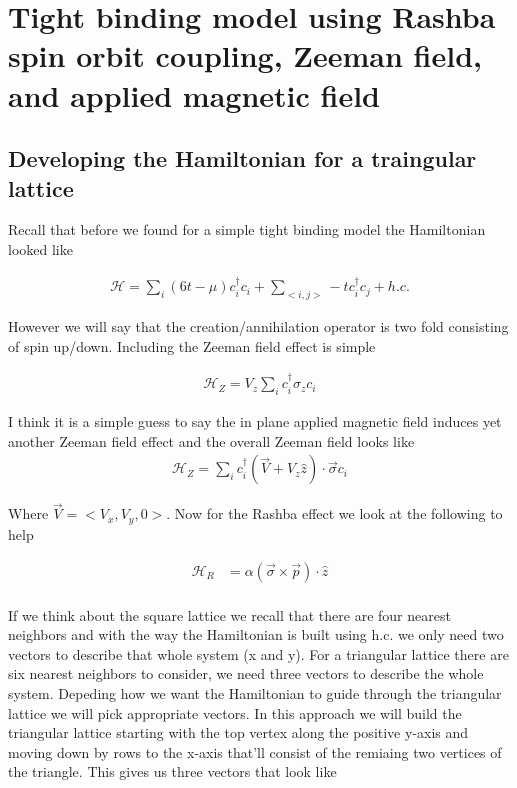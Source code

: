 \chapter{Tight binding model using Rashba spin orbit coupling, Zeeman field, and applied magnetic field}
\section{Developing the Hamiltonian for a traingular lattice}

Recall that before we found for a simple tight binding model the Hamiltonian looked like

\begin{align}
  \mathcal{H} = \sum\limits_{i} (6t-\mu)c^{\dagger}_{i}c_{i} + \sum\limits_{<i,j>} -tc^{\dagger}_{i}c_{j} + h.c.
\end{align}

However we will say that the creation/annihilation operator is two fold consisting of spin up/down. Including the Zeeman field effect is simple 

\begin{align}
  \mathcal{H}_Z = V_z\sum\limits_ic^{\dagger}_i \sigma_z c_i
\end{align}

I think it is a simple guess to say the in plane applied magnetic field induces yet another Zeeman field effect and the overall Zeeman field looks like 
\begin{align}
  \mathcal{H}_Z = \sum\limits_i c^{\dagger}_i (\vec{V}+V_z\hat{z})\cdot \vec{\sigma} c_i
\end{align}

Where $\vec{V} = <V_x,V_y,0>$. Now for the Rashba effect we look at the following to help 

\begin{align}
  \mathcal{H}_R &= \alpha (\vec{\sigma}\times \vec{p}) \cdot \hat{z} \\
\end{align}

If we think about the square lattice we recall that there are four nearest neighbors and with the way the Hamiltonian is built using h.c. we only need two vectors to describe that whole system (x and y). For a triangular lattice there are six nearest neighbors to consider, we need three vectors to describe the whole system. Depeding how we want the Hamiltonian to guide through the triangular lattice we will pick appropriate vectors. In this approach we will build the triangular lattice starting with the top vertex along the positive y-axis and moving down by rows to the x-axis that'll consist of the remiaing two vertices of the triangle. This gives us three vectors that look like

